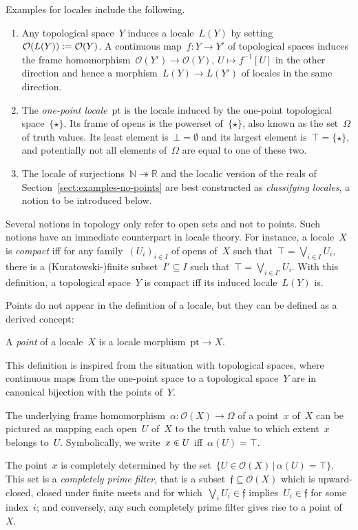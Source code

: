 \documentclass{ws-rv9x6}
\renewcommand{\O}{\mathcal{O}}
\newcommand{\NN}{\mathbb{N}}
\newcommand{\RR}{\mathbb{R}}
\newcommand{\fff}{\mathfrak{f}}
\newcommand{\defeq}{\vcentcolon=}
\renewcommand{\_}{\mathpunct{.}}
\newcommand{\?}{\,{:}\,}
\newcommand{\pt}{\mathrm{pt}}
\begin{document}
Examples for locales include the following.
\begin{enumerate}
\item Any topological space~$Y$ induces a locale~$L(Y)$ by
setting~$\O(L(Y)) \defeq \O(Y)$. A continuous map~$f : Y \to Y'$ of topological
spaces induces the frame homomorphism~$\O(Y') \to \O(Y),\,U \mapsto f^{-1}[U]$
in the other direction and hence a morphism~$L(Y) \to L(Y')$ of locales in the
same direction.
\item The \emph{one-point locale}~$\pt$ is the locale induced
by the one-point topological space~$\{\star\}$. Its frame of opens is
the powerset of~$\{\star\}$, also known as the set~$\Omega$ of truth
values. Its least element is~$\bot = \emptyset$ and its largest element
is~$\top = \{\star\}$, and potentially not all elements of~$\Omega$ are equal
to one of these two.
\item The locale of surjections~$\NN \twoheadrightarrow \RR$ and the localic
version of the reals of Section~\ref{sect:examples-no-points} are best
constructed as \emph{classifying locales}, a notion to be introduced below.
\end{enumerate}

Several notions in topology only refer to open sets and not to points. Such
notions have an immediate counterpart in locale theory. For instance, a
locale~$X$ is \emph{compact} iff for any family~$(U_i)_{i \in I}$ of opens
of~$X$ such that~$\top = \bigvee_{i \in I} U_i$, there is a (Kuratowski-)finite
subset~$I' \subseteq I$ such that~$\top = \bigvee_{i \in I'} U_i$.
With this definition, a topological space~$Y$ is compact iff its induced locale~$L(Y)$ is.

Points do not appear in the definition of a locale, but they can be defined as
a derived concept:
\begin{definition}A \emph{point} of a locale~$X$ is a locale morphism~$\pt \to
X$.\end{definition}

This definition is inspired from the situation with topological spaces, where
continuous maps from the one-point space to a topological space~$Y$ are in
canonical bijection with the points of~$Y$.

The underlying frame homomorphism~$\alpha : \O(X) \to \Omega$ of a point~$x$
of~$X$ can be pictured as mapping each open~$U$ of~$X$ to the truth value to which
extent~$x$ belongs to~$U$. Symbolically, we write~$x \inplus U$ iff~$\alpha(U)
= \top$.

The point~$x$ is completely determined by the
set~$\{ U \in \O(X) \,|\, \alpha(U) = \top \}$. This set is a \emph{completely
prime filter}, that is a subset~$\fff \subseteq \O(X)$ which is upward-closed,
closed under finite meets and for which~$\bigvee_i U_i \in \fff$ implies~$U_i
\in \fff$ for some index~$i$; and conversely, any such completely prime filter
gives rise to a point of~$X$.
\end{document}
